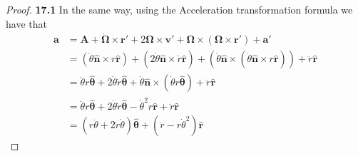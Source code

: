 \documentclass[11pt]{article}
\newcommand{\hatr}{\bm{\hat{r}}}
\newcommand{\hatn}{\bm{\hat{n}}}
\newcommand{\hatth}{\bm{\hat{\theta}}}
\theoremstyle{definition}
\begin{document}
\begin{proof}{\textbf{17.1}}
    In the same way, using the Acceleration transformation formula we have that
    \begin{align*}
        \bm{a} &= \bm{A} + \bm\dot\Omega \times \bm{r}' + 2\bm\Omega \times \bm v'
        + \bm\Omega \times (\bm\Omega \times \bm r') + \bm a'\\
        &= (\ddot\theta \hatn \times r\hatr)
        + (2\dot\theta \hatn \times \dot r \hatr)
        + (\dot\theta \hatn \times (\dot\theta \hatn \times r\hatr))
        + \ddot r\hatr\\
        &= \ddot\theta r \hatth + 2\dot\theta\dot r \hatth
        + \dot\theta \hatn \times (\dot\theta r\hatth) + \ddot r\hatr\\
        &= \ddot\theta r \hatth + 2\dot\theta\dot r \hatth
        - \dot\theta^2 r\hatr + \ddot r\hatr\\
        &= (r\ddot\theta + 2\dot r\dot\theta)\hatth
        +(\ddot r - r\dot\theta^2)\hatr
    \end{align*}
\end{proof}
\cleardoublepage
\end{document}
